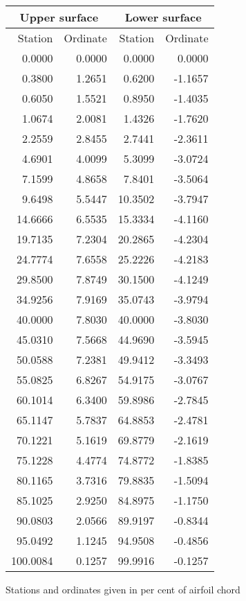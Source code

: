 \documentclass[11pt]{book}
\begin{document}
 \hspace{4mm}
 \begin{tabular}{|r|r|r|r|} \hline 
 \multicolumn{2}{|c|}{Upper surface} & \multicolumn{2}{|c|}{Lower surface} \\
 \hline
 Station & Ordinate & Station & Ordinate \\
 \hline
0.0000 & 0.0000 & 0.0000 & 0.0000 \\
0.3800 & 1.2651 & 0.6200 & -1.1657 \\
0.6050 & 1.5521 & 0.8950 & -1.4035 \\
1.0674 & 2.0081 & 1.4326 & -1.7620 \\
2.2559 & 2.8455 & 2.7441 & -2.3611 \\
4.6901 & 4.0099 & 5.3099 & -3.0724 \\
7.1599 & 4.8658 & 7.8401 & -3.5064 \\
9.6498 & 5.5447 & 10.3502 & -3.7947 \\
14.6666 & 6.5535 & 15.3334 & -4.1160 \\
19.7135 & 7.2304 & 20.2865 & -4.2304 \\
24.7774 & 7.6558 & 25.2226 & -4.2183 \\
29.8500 & 7.8749 & 30.1500 & -4.1249 \\
34.9256 & 7.9169 & 35.0743 & -3.9794 \\
40.0000 & 7.8030 & 40.0000 & -3.8030 \\
45.0310 & 7.5668 & 44.9690 & -3.5945 \\
50.0588 & 7.2381 & 49.9412 & -3.3493 \\
55.0825 & 6.8267 & 54.9175 & -3.0767 \\
60.1014 & 6.3400 & 59.8986 & -2.7845 \\
65.1147 & 5.7837 & 64.8853 & -2.4781 \\
70.1221 & 5.1619 & 69.8779 & -2.1619 \\
75.1228 & 4.4774 & 74.8772 & -1.8385 \\
80.1165 & 3.7316 & 79.8835 & -1.5094 \\
85.1025 & 2.9250 & 84.8975 & -1.1750 \\
90.0803 & 2.0566 & 89.9197 & -0.8344 \\
95.0492 & 1.1245 & 94.9508 & -0.4856 \\
100.0084 & 0.1257 & 99.9916 & -0.1257 \\
 \hline 
 \end{tabular}
 \vspace{8mm}

Stations and ordinates given in per cent of airfoil chord
\end{document}
